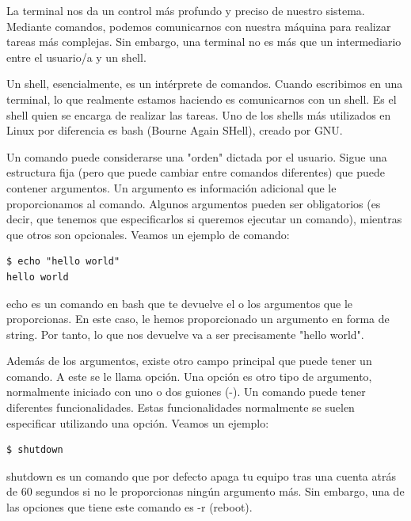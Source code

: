 La terminal nos da un control más profundo y preciso de nuestro sistema. Mediante comandos, podemos comunicarnos con nuestra máquina para realizar tareas más complejas. Sin embargo, una terminal no es más que un intermediario entre el usuario/a y un shell.

Un shell, esencialmente, es un intérprete de comandos. Cuando escribimos en una terminal, lo que realmente estamos haciendo es comunicarnos con un shell. Es el shell quien se encarga de realizar las tareas. Uno de los shells más utilizados en Linux por diferencia es bash (Bourne Again SHell), creado por GNU.

Un comando puede considerarse una "orden" dictada por el usuario. Sigue una estructura fija (pero que puede cambiar entre comandos diferentes) que puede contener argumentos. Un argumento es información adicional que le proporcionamos al comando. Algunos argumentos pueden ser obligatorios (es decir, que tenemos que especificarlos si queremos ejecutar un comando), mientras que otros son opcionales. Veamos un ejemplo de comando:

\begin{tcolorbox-code}
\begin{lstlisting}
$ echo "hello world"
hello world
\end{lstlisting}
\end{tcolorbox-code}

echo es un comando en bash que te devuelve el o los argumentos que le proporcionas. En este caso, le hemos proporcionado un argumento en forma de string. Por tanto, lo que nos devuelve va a ser precisamente "hello world".


Además de los argumentos, existe otro campo principal que puede tener un comando. A este se le llama opción. Una opción es otro tipo de argumento, normalmente iniciado con uno o dos guiones (-). Un comando puede tener diferentes funcionalidades. Estas funcionalidades normalmente se suelen especificar utilizando una opción. Veamos un ejemplo:

\begin{tcolorbox-code}
\begin{lstlisting}
$ shutdown
\end{lstlisting}
\end{tcolorbox-code}

shutdown es un comando que por defecto apaga tu equipo tras una cuenta atrás de 60 segundos si no le proporcionas ningún argumento más. Sin embargo, una de las opciones que tiene este comando es -r (reboot).

